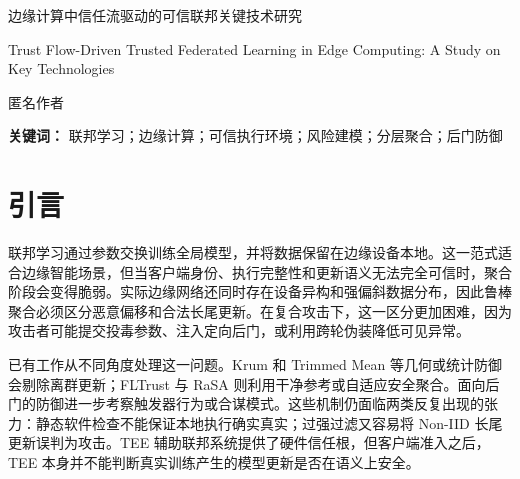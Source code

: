 \documentclass[10pt,a4paper,UTF8,fontset=fandol]{ctexart}
\begin{document}
\begin{center}
{\Large 边缘计算中信任流驱动的可信联邦关键技术研究\par}
\vspace{4pt}
{\large Trust Flow-Driven Trusted Federated Learning in Edge Computing: A Study on Key Technologies\par}
\vspace{8pt}
{匿名作者\par}
\end{center}

\begin{abstract}
联邦学习（FL）通过避免原始数据迁移来支持边缘智能协同训练，但开放式边缘参与也使聚合过程暴露于不可信执行、模型投毒、隐蔽后门以及严重 Non-IID 偏移等风险之下。现有鲁棒聚合方法往往依赖更严格的阈值来拒绝恶意更新，却容易同时剔除合法的长尾客户端。本文提出一种信任流驱动的可信联邦学习框架，将硬件锚定准入、运行时信任证据、双流信誉演化和风险门控分层聚合联系起来。该方法通过历史性能流和瞬时风险流分离长期效用与短期攻击风险，再利用按层门控、裁剪和幸存者权重重归一化，在抑制投毒更新的同时保留有价值的异构贡献。基于 Flower/PyTorch 的 CIFAR-10 实验包含 20 个准入客户端、6 类混合攻击和 5 次重复运行；结果表明，在 30\% 恶意设置下，该方法达到 92.31\% 的准确率和 10.21\% 的 ASR，永久封禁误杀率接近零。
\end{abstract}

\noindent\textbf{关键词：} 联邦学习；边缘计算；可信执行环境；风险建模；分层聚合；后门防御

\section{引言}

联邦学习通过参数交换训练全局模型，并将数据保留在边缘设备本地\cite{kairouz2021flsurvey,mcmahan2017fedavg}。这一范式适合边缘智能场景，但当客户端身份、执行完整性和更新语义无法完全可信时，聚合阶段会变得脆弱。实际边缘网络还同时存在设备异构和强偏斜数据分布，因此鲁棒聚合必须区分恶意偏移和合法长尾更新。在复合攻击下，这一区分更加困难，因为攻击者可能提交投毒参数、注入定向后门，或利用跨轮伪装降低可见异常。

已有工作从不同角度处理这一问题。Krum 和 Trimmed Mean 等几何或统计防御会剔除离群更新\cite{blanchard2017krum,yin2018byzantine}；FLTrust 与 RaSA 则利用干净参考或自适应安全聚合\cite{cao2021fltrust,wang2025rasa}。面向后门的防御进一步考察触发器行为或合谋模式\cite{bagdasaryan2020backdoor,wang2019neuralcleanse,flpurifier,roseagg}。这些机制仍面临两类反复出现的张力：静态软件检查不能保证本地执行确实真实；过强过滤又容易将 Non-IID 长尾更新误判为攻击。TEE 辅助联邦系统提供了硬件信任根\cite{zhang2025rppfl,r1_tee_integrity,r5_tee_mitigating,lu2025tmt}，但客户端准入之后，TEE 本身并不能判断真实训练产生的模型更新是否在语义上安全。
\end{document}
